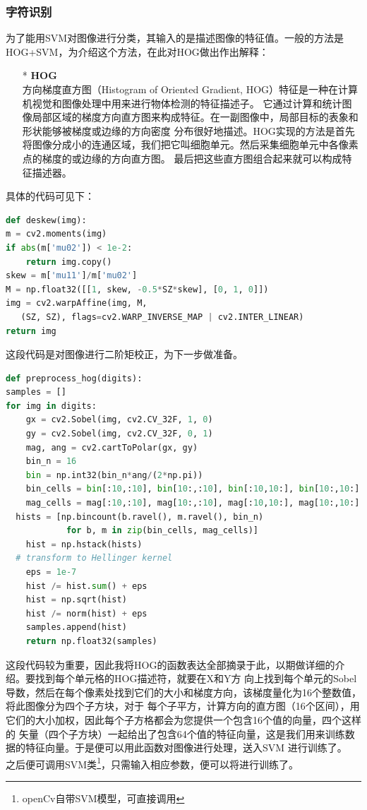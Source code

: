 \documentclass[UTF8,10pt,titlepage,a4paper]{ctexart}
\begin{document}
\subsubsection{字符识别}
为了能用SVM对图像进行分类，其输入的是描述图像的特征值。一般的方法是HOG+SVM，为介绍这个方法，在此对HOG做出作出解释：
\begin{itemize}
  \item[*] \textbf{HOG}\\
  方向梯度直方图（Histogram of Oriented Gradient, HOG）特征是一种在计算机视觉和图像处理中用来进行物体检测的特征描述子。
  它通过计算和统计图像局部区域的梯度方向直方图来构成特征。在一副图像中，局部目标的表象和形状能够被梯度或边缘的方向密度
  分布很好地描述。HOG实现的方法是首先将图像分成小的连通区域，我们把它叫细胞单元。然后采集细胞单元中各像素点的梯度的或边缘的方向直方图。
  最后把这些直方图组合起来就可以构成特征描述器。
\end{itemize}
具体的代码可见下：
\begin{lstlisting}[language=python]
def deskew(img):
m = cv2.moments(img)
if abs(m['mu02']) < 1e-2:
	return img.copy()
skew = m['mu11']/m['mu02']
M = np.float32([[1, skew, -0.5*SZ*skew], [0, 1, 0]])
img = cv2.warpAffine(img, M,
   (SZ, SZ), flags=cv2.WARP_INVERSE_MAP | cv2.INTER_LINEAR)
return img
\end{lstlisting} 
这段代码是对图像进行二阶矩校正，为下一步做准备。
\newpage
\begin{lstlisting}[language=python]
def preprocess_hog(digits):
samples = []
for img in digits:
	gx = cv2.Sobel(img, cv2.CV_32F, 1, 0)
	gy = cv2.Sobel(img, cv2.CV_32F, 0, 1)
	mag, ang = cv2.cartToPolar(gx, gy)
	bin_n = 16
	bin = np.int32(bin_n*ang/(2*np.pi))
	bin_cells = bin[:10,:10], bin[10:,:10], bin[:10,10:], bin[10:,10:]
	mag_cells = mag[:10,:10], mag[10:,:10], mag[:10,10:], mag[10:,10:]
  hists = [np.bincount(b.ravel(), m.ravel(), bin_n) 
            for b, m in zip(bin_cells, mag_cells)]
	hist = np.hstack(hists)
  # transform to Hellinger kernel
	eps = 1e-7
	hist /= hist.sum() + eps
	hist = np.sqrt(hist)
	hist /= norm(hist) + eps
	samples.append(hist)
	return np.float32(samples)
\end{lstlisting} 
这段代码较为重要，因此我将HOG的函数表达全部摘录于此，以期做详细的介绍。要找到每个单元格的HOG描述符，就要在X和Y方
向上找到每个单元的Sobel导数，然后在每个像素处找到它们的大小和梯度方向，该梯度量化为16个整数值，将此图像分为四个子方块，对于
每个子平方，计算方向的直方图（16个区间），用它们的大小加权，因此每个子方格都会为您提供一个包含16个值的向量，四个这样的
矢量（四个子方块）一起给出了包含64个值的特征向量，这是我们用来训练数据的特征向量。于是便可以用此函数对图像进行处理，送入SVM
进行训练了。\\
之后便可调用SVM类\footnote{openCv自带SVM模型，可直接调用}，只需输入相应参数，便可以将进行训练了。
\end{document}
